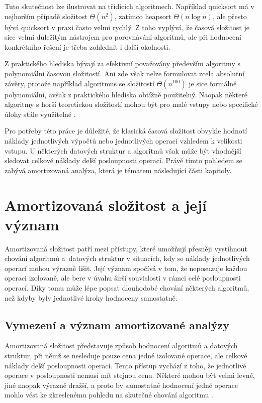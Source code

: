 Tuto skutečnost lze ilustrovat na třídicích algoritmech. Například quicksort má v nejhorším případě složitost \(\Theta(n^2)\), zatímco heapsort \(\Theta(n \log n)\), ale přesto bývá quicksort v praxi často velmi rychlý. Z toho vyplývá, že časová složitost je sice velmi důležitým nástrojem pro porovnávání algoritmů, ale při hodnocení konkrétního řešení je třeba zohlednit i další okolnosti.

Z praktického hlediska bývají za efektivní považovány především algoritmy s polynomiální časovou složitostí. Ani zde však nelze formulovat zcela absolutní závěry, protože například algoritmus se složitostí \(\Theta(n^{100})\) je sice formálně polynomiální, avšak z praktického hlediska obtížně použitelný. Naopak některé algoritmy s horší teoretickou složitostí mohou být pro malé vstupy nebo specifické úlohy stále využitelné \cite{mit_big_o}.

Pro potřeby této práce je důležité, že klasická časová složitost obvykle hodnotí náklady jednotlivých výpočtů nebo jednotlivých operací vzhledem k velikosti vstupu. U některých datových struktur a algoritmů však může být vhodnější sledovat celkové náklady delší posloupnosti operací. Právě tímto pohledem se zabývá amortizovaná analýza, která je tématem následující části kapitoly.
\newpage


\section{Amortizovaná složitost a její význam}
Amortizovaná složitost patří mezi přístupy, které umožňují přesněji vystihnout chování algoritmů a~datových struktur v situacích, kdy se náklady jednotlivých operací mohou výrazně lišit. Její význam spočívá v tom, že neposuzuje každou operaci izolovaně, ale bere v úvahu širší souvislosti v rámci celé posloupnosti operací. Díky tomu může lépe popsat dlouhodobé chování některých algoritmů, než kdyby byly jednotlivé kroky hodnoceny samostatně.

\subsection{Vymezení a význam amortizované analýzy}
Amortizovaná složitost představuje způsob hodnocení algoritmů a datových struktur, při němž se nesleduje pouze cena jedné izolované operace, ale celkové náklady delší posloupnosti operací. Tento přístup vychází z toho, že jednotlivé operace v posloupnosti nemusí mít stejnou cenu. Některé mohou být velmi levné, jiné naopak výrazně dražší, a proto by samostatné hodnocení jedné operace mohlo vést ke zkreslenému pohledu na skutečné chování algoritmu \cite{tarjan1985amortized,kozen_amortized}.

